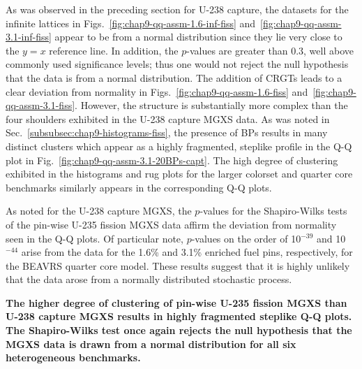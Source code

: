 As was observed in the preceding section for U-238 capture, the datasets for the infinite lattices in Figs.~\ref{fig:chap9-qq-assm-1.6-inf-fiss} and~\ref{fig:chap9-qq-assm-3.1-inf-fiss} appear to be from a normal distribution since they lie very close to the $y = x$ reference line. In addition, the $p$-values are greater than 0.3, well above commonly used significance levels; thus one would not reject the null hypothesis that the data is from a normal distribution. The addition of \acp{CRGT} leads to a clear deviation from normality in Figs.~\ref{fig:chap9-qq-assm-1.6-fiss} and~\ref{fig:chap9-qq-assm-3.1-fiss}. However, the structure is substantially more complex than the four shoulders exhibited in the U-238 capture \ac{MGXS} data. As was noted in Sec.~\ref{subsubsec:chap9-histograms-fiss}, the presence of \acp{BP} results in many distinct clusters which appear as a highly fragmented, steplike profile in the \ac{Q-Q} plot in Fig.~\ref{fig:chap9-qq-assm-3.1-20BPs-capt}. The high degree of clustering exhibited in the histograms and rug plots for the larger colorset and quarter core benchmarks similarly appears in the corresponding \ac{Q-Q} plots.

As noted for the U-238 capture \ac{MGXS}, the $p$-values for the Shapiro-Wilks tests of the pin-wise U-235 fission \ac{MGXS} data affirm the deviation from normality seen in the \ac{Q-Q} plots. Of particular note, $p$-values on the order of 10$^{-39}$ and 10$^{-44}$ arise from the data for the 1.6\% and 3.1\% enriched fuel pins, respectively, for the \ac{BEAVRS} quarter core model. These results suggest that it is highly unlikely that the data arose from a normally distributed stochastic process.


\begin{emphbox}
\textbf{The higher degree of clustering of pin-wise U-235 fission \ac{MGXS} than U-238 capture \ac{MGXS} results in highly fragmented steplike \ac{Q-Q} plots. The Shapiro-Wilks test once again rejects the null hypothesis that the \ac{MGXS} data is drawn from a normal distribution for all six heterogeneous benchmarks.}
\end{emphbox}


